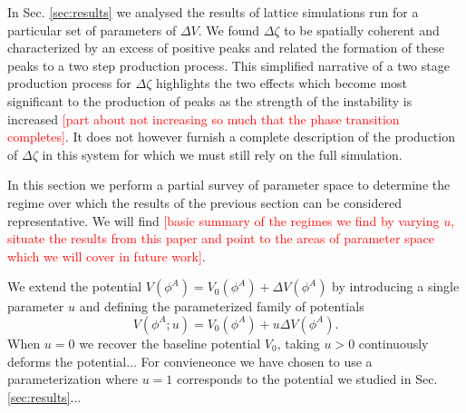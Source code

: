 In Sec. \ref{sec:results} we analysed the results of lattice simulations run for a particular set of parameters of $\Delta V$. We found $\Delta\zeta$ to be spatially coherent and characterized by an excess of positive peaks and related the formation of these peaks to a two step production process. %
This simplified narrative of a two stage production process for $\Delta\zeta$ highlights the two effects which become most significant to the production of peaks as the strength of the instability is increased \textcolor{red}{[part about not increasing so much that the phase transition completes]}.
It does not however furnish a complete description of the production of $\Delta\zeta$ in this system for which we must still rely on the full simulation.

In this section we perform a partial survey of parameter space to determine the regime over which the results of the previous section can be considered representative. We will find \textcolor{red}{[basic summary of the regimes we find by varying $u$, situate the results from this paper and point to the areas of parameter space which we will cover in future work]}.


We extend the potential $V(\phi^A) = V_0(\phi^A) + \Delta V(\phi^A)$ by introducing a single parameter $u$ and defining the parameterized family of potentials
\begin{equation}
  V(\phi^A;u) = V_0(\phi^A) + u\Delta V(\phi^A).
\end{equation}
When $u=0$ we recover the baseline potential $V_0$, taking $u>0$ continuously deforms the potential...
For convieneonce we have chosen to use a parameterization where $u=1$ corresponds to the potential we studied in Sec. \ref{sec:results}...

